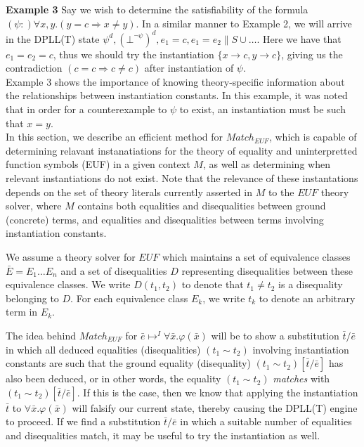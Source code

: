 \documentclass{llncs}
\begin{document}
{\bf Example 3} 
Say we wish to determine the satisfiability of the formula $(\psi :) \forall x, y. ( y = c \Rightarrow x \neq y )$.
In a similar manner to Example 2, we will arrive in the DPLL(T) state $\psi^d, (\bot^{ \neg \psi })^d, e_1 = c, e_1 = e_2 \parallel S \cup \ldots$.
Here we have that $e_1 = e_2 = c$, thus we should try the instantiation $\{ x \rightarrow c, y \rightarrow c \}$, giving us the contradiction $( c = c \Rightarrow c \neq c )$ after instantiation of $\psi$. \\

Example 3 shows the importance of knowing theory-specific information about the relationships between instantiation constants.  
In this example, it was noted that in order for a counterexample to $\psi$ to exist, an instantiation must be such that $x = y$. \\

In this section, we describe an efficient method for $Match_{EUF}$, which is capable of determining relavant instanatiations for the theory of equality and uninterpretted function symbols (EUF) in a given context $M$, as well as determining when relevant instantiations do not exist.
Note that the relevance of these instantations depends on the set of theory literals currently asserted in $M$ to the $EUF$ theory solver, where $M$ contains both equalities and disequalities between ground (concrete) terms, and equalities and disequalities between terms involving instantiation constants.

We assume a theory solver for $EUF$ which maintains a set of equivalence classes $\bar{E} = E_1 \ldots E_n$ and a set of disequalities $D$ representing disequalities between these equivalence classes.    
We write $D( t_1, t_2 )$ to denote that $t_1 \neq t_2$ is a disequality belonging to $D$.
For each equivalence class $E_k$, we write $t_k$ to denote an arbitrary term in $E_k$.

The idea behind $Match_{EUF}$ for $\bar{e} \mapsto^I \forall \bar{x}. \varphi( \bar{x} )$ will be to show a substitution $\bar{t}/\bar{e}$ in which all deduced equalities (disequalities) $(t_1 \sim t_2)$ involving instantiation constants are such that the ground equality (disequality) $( t_1 \sim t_2 )[\bar{t}/\bar{e}]$ has also been deduced, or in other words, the equality $(t_1 \sim t_2)$ \emph{matches} with $( t_1 \sim t_2 )[\bar{t}/\bar{e}]$.
If this is the case, then we know that applying the instantiation $\bar{t}$ to $\forall \bar{x}. \varphi( \bar{x} )$ will falsify our current state, thereby causing the DPLL(T) engine to proceed.
If we find a substitution $\bar{t}/\bar{e}$ in which a suitable number of equalities and disequalities match, it may be useful to try the instantiation as well.
\end{document}
